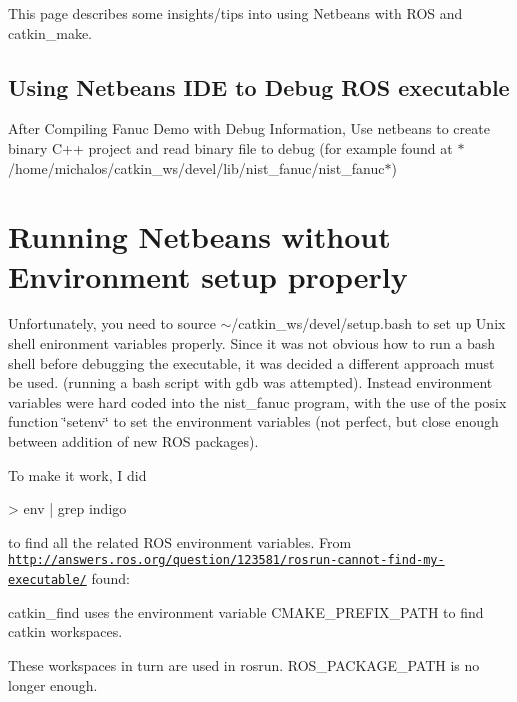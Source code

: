 This page describes some insights/tips into using Netbeans with R\-O\-S and catkin\-\_\-make.

\subsection*{Using Netbeans I\-D\-E to Debug R\-O\-S executable }

After Compiling Fanuc Demo with Debug Information, Use netbeans to create binary C++ project and read binary file to debug (for example found at $\ast$/home/michalos/catkin\-\_\-ws/devel/lib/nist\-\_\-fanuc/nist\-\_\-fanuc$\ast$)

\section*{Running Netbeans without Environment setup properly }

Unfortunately, you need to source $\sim$/catkin\-\_\-ws/devel/setup.bash to set up Unix shell enironment variables properly. Since it was not obvious how to run a bash shell before debugging the executable, it was decided a different approach must be used. (running a bash script with gdb was attempted). Instead environment variables were hard coded into the nist\-\_\-fanuc program, with the use of the posix function \char`\"{}setenv\char`\"{} to set the environment variables (not perfect, but close enough between addition of new R\-O\-S packages).

To make it work, I did \begin{DoxyVerb}> env | grep indigo
\end{DoxyVerb}


to find all the related R\-O\-S environment variables. From \href{http://answers.ros.org/question/123581/rosrun-cannot-find-my-executable/}{\tt http\-://answers.\-ros.\-org/question/123581/rosrun-\/cannot-\/find-\/my-\/executable/} found\-: \begin{DoxyVerb}catkin_find uses the environment variable CMAKE_PREFIX_PATH to find catkin workspaces.
\end{DoxyVerb}


These workspaces in turn are used in rosrun. R\-O\-S\-\_\-\-P\-A\-C\-K\-A\-G\-E\-\_\-\-P\-A\-T\-H is no longer enough.


